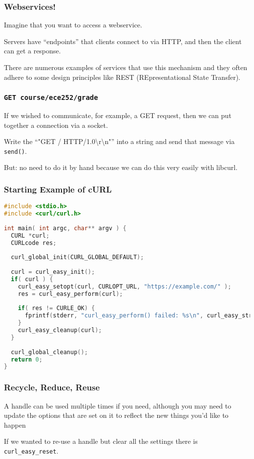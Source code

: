 \begin{frame}
	\frametitle{Webservices!}

	Imagine that you want to access a webservice.

	Servers have ``endpoints'' that clients connect to via HTTP, and then the client can get a response.

	There are numerous examples of services that use this mechanism and they often adhere to some design principles like REST (REpresentational State Transfer).

\end{frame}



\begin{frame}
	\frametitle{\texttt{GET course/ece252/grade}}

	If we wished to communicate, for example, a GET request, then we can put together a connection via a socket.

	Write the ``"GET / HTTP/1.0\textbackslash r\textbackslash n"'' into a string and send that message via \texttt{send()}.

	But: no need to do it by hand because we can do this very easily with libcurl.

\end{frame}



\begin{frame}[fragile]
	\frametitle{Starting Example of cURL}

	\begin{lstlisting}[language=C]
#include <stdio.h>
#include <curl/curl.h>
 
int main( int argc, char** argv ) {
  CURL *curl;
  CURLcode res;
 
  curl_global_init(CURL_GLOBAL_DEFAULT);
 
  curl = curl_easy_init();
  if( curl ) {
    curl_easy_setopt(curl, CURLOPT_URL, "https://example.com/" );
    res = curl_easy_perform(curl);
    
    if( res != CURLE_OK) {
      fprintf(stderr, "curl_easy_perform() failed: %s\n", curl_easy_strerror(res));
    }
    curl_easy_cleanup(curl);
  }
 
  curl_global_cleanup();
  return 0;
}
\end{lstlisting}

\end{frame}



\begin{frame}
	\frametitle{Recycle, Reduce, Reuse}

	A handle can be used multiple times if you need, although you may need to update the options that are set on it to reflect the new things you'd like to happen

	If we wanted to re-use a handle but clear all the settings there is \texttt{curl\_easy\_reset}.

\end{frame}



